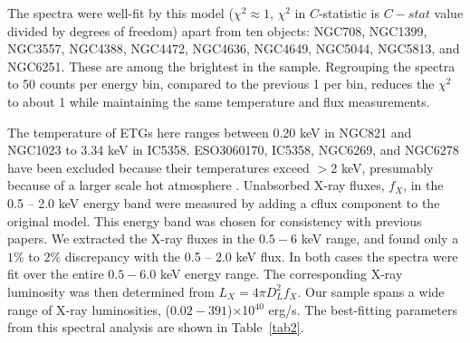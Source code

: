 \documentclass[iop]{emulateapj}
\begin{document}
The spectra were well-fit by this model ($\chi^2\approx 1$, $\chi^2$ in $C$-statistic is $C-stat$ value divided by degrees of freedom) apart from ten objects: NGC708, NGC1399, NGC3557, NGC4388, NGC4472, NGC4636, NGC4649, NGC5044, NGC5813, and NGC6251. These are among the brightest in the sample. Regrouping the spectra to 50 counts per energy bin, compared to the previous 1 per bin, reduces the $\chi^2$ to about 1 while maintaining the same temperature and flux measurements.

The temperature of ETGs here ranges between 0.20 keV in NGC821 and NGC1023 to 3.34 keV in IC5358. ESO3060170, IC5358, NGC6269, and NGC6278 have been excluded because their temperatures exceed $>$2 keV, presumably because of a larger scale hot atmosphere \citep{Werner:12}. 
Unabsorbed X-ray fluxes, $f_X$, in the 0.5 -- 2.0 keV energy band were measured by adding a {\sc cflux} component to the original model. This energy band was chosen for consistency with previous papers. We  extracted the X-ray fluxes in the $0.5 - 6$ keV range, and found only a $1\%$ to $2\%$ discrepancy with the 0.5 -- 2.0 keV flux. In both cases the spectra were fit over the entire $0.5-6.0$ keV energy range. The corresponding X-ray luminosity was then determined from $L_{X} = 4\pi D_{L}^{2} f_{X}$. Our sample spans a wide range of X-ray luminosities, ($0.02-391$)$\times$10$^{40}$ erg/s. The best-fitting parameters from this spectral analysis are shown in Table~\ref{tab2}.
\end{document}
